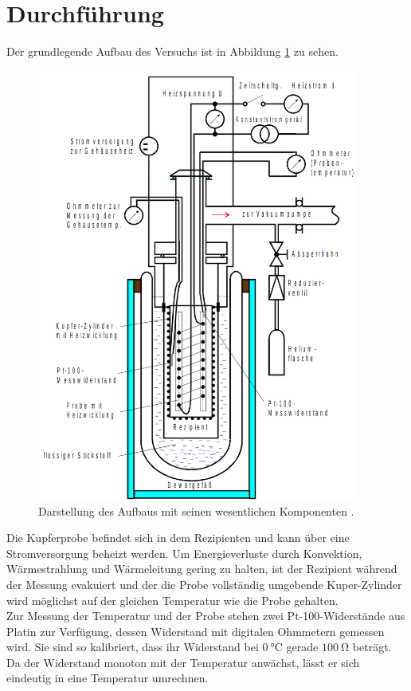 \section{Durchführung}
\label{sec:Durchführung}

Der grundlegende Aufbau des Versuchs ist in Abbildung \ref{fig:aufbau} zu sehen.

\begin{figure}
  \centering
  \includegraphics[width=300pt]{data/aufbau.png}
  \caption{Darstellung des Aufbaus mit seinen wesentlichen Komponenten \cite{versuchsanleitung}.}
  \label{fig:aufbau}
\end{figure}

Die Kupferprobe befindet sich in dem Rezipienten und kann über eine Stromversorgung beheizt werden. Um Energieverluste durch Konvektion, Wärmestrahlung und Wärmeleitung gering zu halten, ist der Rezipient während der Messung evakuiert und der die Probe vollständig umgebende Kuper-Zylinder wird möglichst auf der gleichen Temperatur wie die Probe gehalten.\\
Zur Messung der Temperatur und der Probe stehen zwei Pt-100-Widerstände aus Platin zur Verfügung, dessen Widerstand mit digitalen Ohmmetern gemessen wird. Sie sind so kalibriert, dass ihr Widerstand bei $\SI{0}{\celsius}$ gerade $\SI{100}{\ohm}$ beträgt. Da der Widerstand monoton mit der Temperatur anwächst, lässt er sich eindeutig in eine Temperatur umrechnen.

